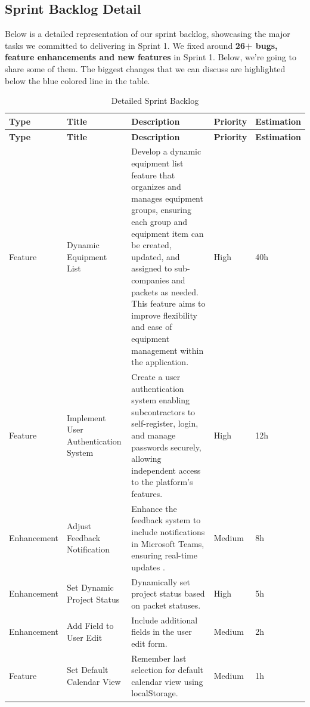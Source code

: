 \subsection{Sprint Backlog Detail}
Below is a detailed representation of our sprint backlog, showcasing the major tasks we committed to delivering in Sprint 1. We fixed around \textbf{26+ bugs, feature enhancements and new features }in Sprint 1. Below, we're going to share some of them. The biggest changes that we can discuss are highlighted below the blue colored line in the table.
\begin{longtable}{ | m{} | m{} | m{} | m{} | m{} | }
    \caption{Detailed Sprint Backlog} \\
    \hline
    \textbf{Type} & \textbf{Title} & \textbf{Description} & \textbf{Priority} & \textbf{Estimation} \\
    \hline
    \endfirsthead
    \hline
    \textbf{Type} & \textbf{Title} & \textbf{Description} & \textbf{Priority} & \textbf{Estimation} \\
    \hline
    \endhead
    \hline
    \endfoot
    \endlastfoot
    \rowcolor{blue!20} 
    Feature & Dynamic Equipment List & Develop a dynamic equipment list feature that organizes and manages equipment groups, ensuring each group and equipment item can be created, updated, and assigned to sub-companies and packets as needed. This feature aims to improve flexibility and ease of equipment management within the application. & High & 40h \\
    \hline
    \rowcolor{blue!20} Feature & Implement User Authentication System & Create a user authentication system enabling subcontractors to self-register, login, and manage passwords securely, allowing independent access to the platform's features. & High & 12h \\
    \hline
    \rowcolor{blue!20} 
    Enhancement & Adjust Feedback Notification & Enhance the feedback system to include notifications in Microsoft Teams, ensuring real-time updates . & Medium & 8h \\
    \hline
    Enhancement & Set Dynamic Project Status & Dynamically set project status based on packet statuses. & High & 5h \\
    \hline
    Enhancement & Add Field to User Edit & Include additional fields in the user edit form. & Medium & 2h \\
    \hline
    Feature & Set Default Calendar View & Remember last selection for default calendar view using localStorage. & Medium & 1h \\

\end{longtable}
